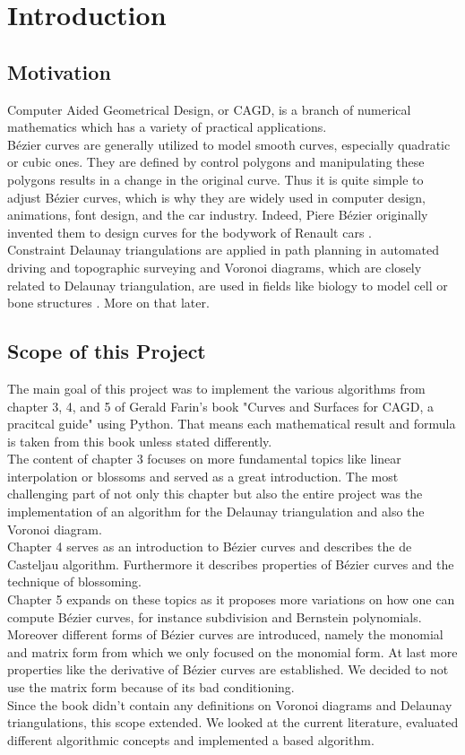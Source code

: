\section{Introduction}
\subsection{Motivation}
Computer Aided Geometrical Design, or CAGD, is a branch of numerical mathematics which has a variety of practical applications.\\
Bézier curves are generally utilized to model smooth curves, especially quadratic or cubic ones. They are defined by control polygons and manipulating these polygons results in a change in the original curve. Thus it is quite simple to adjust Bézier curves, which is why they are widely used in computer design, animations, font design, and the car industry. Indeed, Piere Bézier originally invented them to design curves for the bodywork of Renault cars \cite{10.5555/501891}.\\
Constraint Delaunay triangulations are applied in path planning in automated driving and topographic surveying \cite{6232153} and Voronoi diagrams, which are closely related to Delaunay triangulation, are used in fields like biology to model cell \cite{2009arXiv0901.4469B} or bone structures \cite{2012SPIE.8290E..0PL}. More on that later.

\subsection{Scope of this Project}
The main goal of this project was to implement the various algorithms from chapter 3, 4, and 5 of Gerald Farin's book "Curves and Surfaces for CAGD, a pracitcal guide" using Python. That means each mathematical result and formula is taken from this book unless stated differently. \\
The content of chapter 3 focuses on more fundamental topics like linear interpolation or blossoms and served as a great introduction. The most challenging part of not only this chapter but also the entire project was the implementation of an algorithm for the Delaunay triangulation and also the Voronoi diagram.\\
Chapter 4 serves as an introduction to Bézier curves and describes the de Casteljau algorithm. Furthermore it describes properties of Bézier curves and the technique of blossoming. \\
Chapter 5 expands on these topics as it proposes more variations on how one can compute Bézier curves, for instance subdivision and Bernstein polynomials. Moreover different forms of Bézier curves are introduced, namely the monomial and matrix form from which we only focused on the monomial form. At last more properties like the derivative of Bézier curves are established. We decided to not use the matrix form because of its bad conditioning.\\
Since the book didn't contain any definitions on Voronoi diagrams and Delaunay triangulations, this scope extended. We looked at the current literature, evaluated different algorithmic concepts and implemented a \cite{Green1978} based algorithm. 

